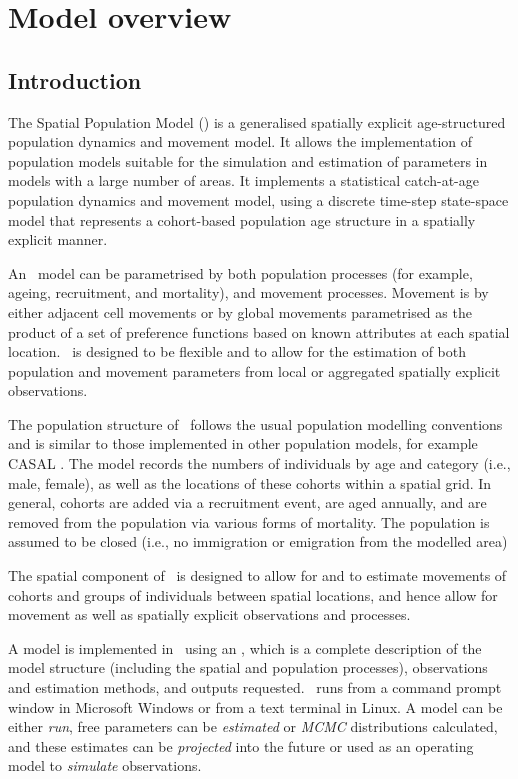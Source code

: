 \section{Model overview\label{sec:getting-started}}

\subsection{Introduction}

The Spatial Population Model (\SPM) is a generalised spatially explicit age-structured population dynamics and movement model. It allows the implementation of population models suitable for the simulation and estimation of parameters in models with a large number of areas. It implements a statistical catch-at-age population dynamics and movement model, using a discrete time-step state-space model that represents a cohort-based population age structure in a spatially explicit manner. 

An \SPM\ model can be parametrised by both population processes (for example, ageing, recruitment, and mortality), and movement processes. Movement is by either adjacent cell movements or by global movements parametrised as the product of a set of preference functions based on known attributes at each spatial location. \SPM\ is designed to be flexible and to allow for the estimation of both population and movement parameters from local or aggregated spatially explicit observations. 

The population structure of \SPM\ follows the usual population modelling conventions and is similar to those implemented in other population models, for example CASAL \citep{1388}. The model records the numbers of individuals by age and category (i.e., male, female), as well as the locations of these cohorts within a spatial grid. In general, cohorts are added via a recruitment event, are aged annually, and are removed from the population via various forms of mortality. The population is assumed to be closed (i.e., no immigration or emigration from the modelled area)

The spatial component of \SPM\ is designed to allow for and to estimate movements of cohorts and groups of individuals between spatial locations, and hence allow for movement as well as spatially explicit observations and processes. 

A model is implemented in \SPM\ using an \config {}, which is a complete description of the model structure (including the spatial and population processes), observations and estimation methods, and outputs requested. \SPM\ runs from a command prompt window in Microsoft Windows or from a text terminal in Linux. A model can be either \emph{run}, free parameters can be \emph{estimated} or \emph{MCMC} distributions calculated, and these estimates can be \emph{projected} into the future or used as an operating model to \emph{simulate} observations.

